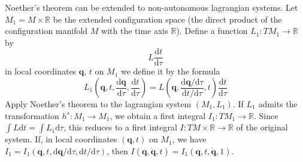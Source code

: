 \documentclass[conference]{IEEEtran}
\theoremstyle{definition}
\theoremstyle{remark}
\begin{document}
    Noether's theorem can be extended to non-autonomous lagrangian systems. Let $M_1 = M \times \mathbb{R}$ be the extended configuration space (the direct product of the configuration manifold $M$ with the time axis $\mathbb{R}$). Define a function $L_1: TM_1 \to \mathbb{R}$ by
    \begin{equation*}
        L\dfrac{\mathrm{d} t}{\mathrm{d} \tau}
    \end{equation*}
    in local coordinates $\mathbf{q}$, $t$ on $M_1$ we define it by the formula
    \begin{equation*}
        L_1 \left( \mathbf{q}, t, \dfrac{\mathrm{d} \mathbf{q}}{\mathrm{d} \tau}, \dfrac{\mathrm{d}t}{\mathrm{d} \tau} \right) = L\left( \mathbf{q}, \dfrac{\mathrm{d} \mathbf{q} / \mathrm{d} \tau}{\mathrm{d} t / \mathrm{d} \tau}, t \right) \dfrac{\mathrm{d} t}{\mathrm{d} \tau}
    \end{equation*}
    Apply Noether's theorem to the lagrangian system $(M_1, L_1)$. If $L_1$ admits the transformation $h^s: M_1 \to M_1$, we obtain a first integral $I_1: TM_1 \to \mathbb{R}$. Since $\int L \mathrm{d} t = \int L_1 \mathrm{d} \tau$, this reduces to a first integral $I: TM \times \mathbb{R} \to \mathbb{R}$ of the original system. If, in local coordinates $(\mathbf{q}, t)$ on $M_1$, we have $I_1 = I_1(\mathbf{q}, t, \mathrm{d} \mathbf{q} / \mathrm{d} \tau, \mathrm{d} t / \mathrm{d} \tau)$, then $I(\mathbf{q}, \dot{\mathbf{q}}, t) = I_1(\mathbf{q}, t, \dot{\mathbf{q}}, 1)$.
\end{document}

